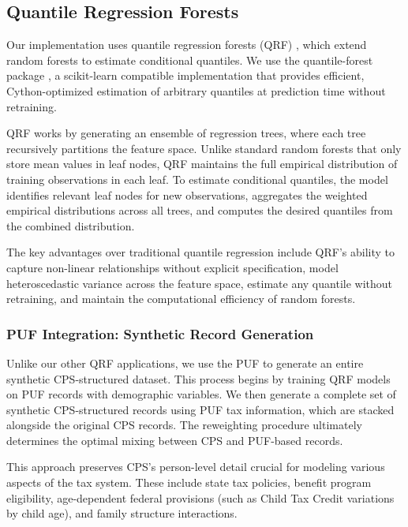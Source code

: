 \subsection{Quantile Regression Forests}

Our implementation uses quantile regression forests (QRF) \citep{meinshausen2006quantile}, which extend random forests to estimate conditional quantiles. We use the quantile-forest package \citep{zillow2024quantile}, a scikit-learn compatible implementation that provides efficient, Cython-optimized estimation of arbitrary quantiles at prediction time without retraining.

QRF works by generating an ensemble of regression trees, where each tree recursively partitions the feature space. Unlike standard random forests that only store mean values in leaf nodes, QRF maintains the full empirical distribution of training observations in each leaf. To estimate conditional quantiles, the model identifies relevant leaf nodes for new observations, aggregates the weighted empirical distributions across all trees, and computes the desired quantiles from the combined distribution.

The key advantages over traditional quantile regression include QRF's ability to capture non-linear relationships without explicit specification, model heteroscedastic variance across the feature space, estimate any quantile without retraining, and maintain the computational efficiency of random forests.

\subsubsection{PUF Integration: Synthetic Record Generation}

Unlike our other QRF applications, we use the PUF to generate an entire synthetic CPS-structured dataset. This process begins by training QRF models on PUF records with demographic variables. We then generate a complete set of synthetic CPS-structured records using PUF tax information, which are stacked alongside the original CPS records. The reweighting procedure ultimately determines the optimal mixing between CPS and PUF-based records.

This approach preserves CPS's person-level detail crucial for modeling various aspects of the tax system. These include state tax policies, benefit program eligibility, age-dependent federal provisions (such as Child Tax Credit variations by child age), and family structure interactions.

